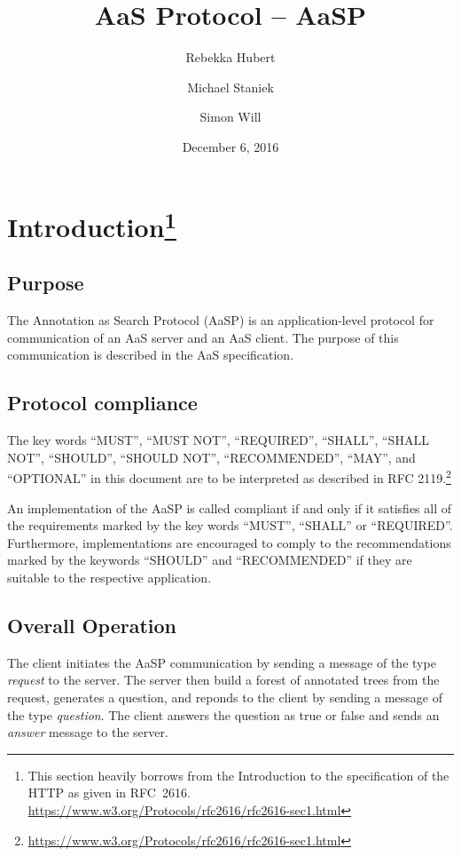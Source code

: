 \documentclass{scrartcl}
\title{AaS Protocol – AaSP}
\author{Rebekka Hubert \and Michael Staniek \and Simon Will}
\date{December 6, 2016}
\newcommand{\messtype}[1]{\emph{#1}}
\newcommand{\checkthis}[1]{#1}
\begin{document}
\maketitle

\section[Introduction]{Introduction\footnote{This section heavily borrows from the Introduction to the specification of the HTTP as given in RFC~2616. \url{https://www.w3.org/Protocols/rfc2616/rfc2616-sec1.html}}}
\label{sec:Introduction}

\subsection{Purpose}
\label{sub:Purpose}

The Annotation as Search Protocol (AaSP) is an application-level protocol for communication of an AaS server and an AaS client.
The purpose of this communication is described in \checkthis{the AaS specification}. %

\subsection{Protocol compliance}
\label{sub:Protocol compliance}

The key words \enquote{MUST}, \enquote{MUST NOT}, \enquote{REQUIRED}, \enquote{SHALL}, \enquote{SHALL NOT}, \enquote{SHOULD}, \enquote{SHOULD NOT}, \enquote{RECOMMENDED},  \enquote{MAY}, and \enquote{OPTIONAL} in this document are to be interpreted as described in RFC 2119.\footnote{\url{https://www.w3.org/Protocols/rfc2616/rfc2616-sec1.html}}

An implementation of the AaSP is called compliant if and only if it satisfies all of the requirements marked by the key words \enquote{MUST}, \enquote{SHALL} or \enquote{REQUIRED}.
Furthermore, implementations are encouraged to comply to the recommendations marked by the keywords \enquote{SHOULD} and \enquote{RECOMMENDED} if they are suitable to the respective application.

\subsection{Overall Operation}
\label{sub:Overall Operation}

The client initiates the AaSP communication by sending a message of the type \messtype{request} to the server.
The server then build a forest of annotated trees from the request, generates a question, and reponds to the client by sending a message of the type \messtype{question}.
The client \checkthis{answers the question as true or false} and sends an \messtype{answer} message to the server.
\end{document}
